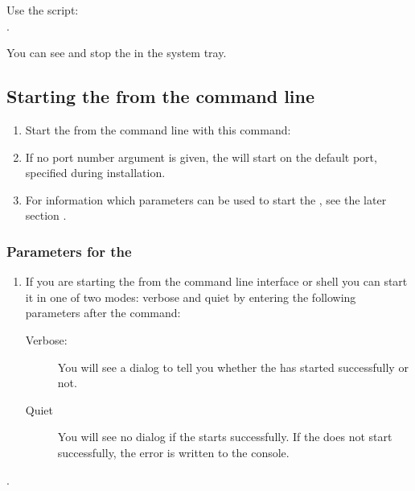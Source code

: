 Use the script:\\
 . 

You can see and stop the \gdagent{} in the system tray. 

\subsection{Starting the \gdserver from the command line}
\label{tasksservercmd}
\begin{enumerate}
\item Start the \gdserver from the command line with this command:\\

\item If no port number argument is given, 
the \gdserver will start on the default port, specified during installation. 

\item  For information which parameters can be used to start the \gdserver{}, see the later section . 

\end{enumerate}

\subsubsection{Parameters for the \gdserver}
\begin{enumerate}
\item If you are starting the \gdserver from the command line interface or shell you can start it in one of two modes: verbose and quiet by entering the following parameters after the \gdserver{} command:\\
\begin{description}
\item [Verbose: ]{You will see a dialog to tell you whether the \gdserver{} has started successfully or not.}
\item [Quiet ]{You will see no dialog if the \gdserver{} starts successfully. If the \gdserver{} does not start successfully, the error is written to the console.}
\end{description}

\end{enumerate}
. 

